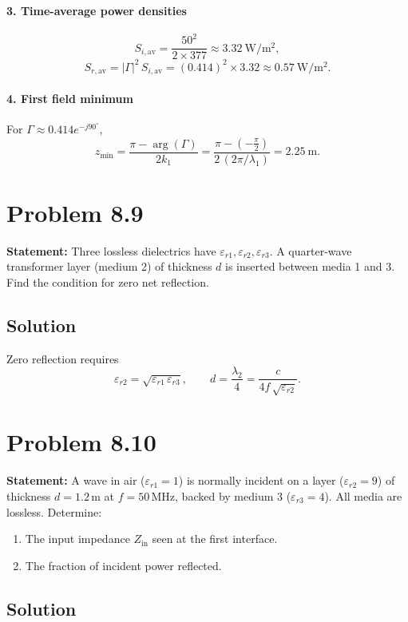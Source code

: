 \paragraph{3. Time-average power densities}
\[
S_{i,\mathrm{av}} = \frac{50^2}{2 \times 377} \approx 3.32\ \mathrm{W/m^2},
\]
\[
S_{r,\mathrm{av}}
= |\Gamma|^2\,S_{i,\mathrm{av}}
= (0.414)^2 \times 3.32
\approx 0.57\ \mathrm{W/m^2}.
\]

\paragraph{4. First field minimum}
For $\Gamma\approx0.414e^{-j90^\circ}$,
\[
z_{\min}
= \frac{\pi - \arg(\Gamma)}{2k_1}
= \frac{\pi - (-\frac{\pi}{2})}{2\,(2\pi/\lambda_1)}
= 2.25\ \mathrm{m}.
\]

\section*{Problem 8.9}
\textbf{Statement:} Three lossless dielectrics have $\varepsilon_{r1}, \varepsilon_{r2}, \varepsilon_{r3}$. A quarter-wave transformer layer (medium 2) of thickness $d$ is inserted between media 1 and 3. Find the condition for zero net reflection.

\subsection*{Solution}
Zero reflection requires
\[
\varepsilon_{r2} = \sqrt{\varepsilon_{r1}\,\varepsilon_{r3}},
\qquad
d = \frac{\lambda_2}{4}
      = \frac{c}{4f\,\sqrt{\varepsilon_{r2}}}.
\]

\section*{Problem 8.10}
\textbf{Statement:} A wave in air ($\varepsilon_{r1}=1$) is normally incident on a layer ($\varepsilon_{r2}=9$) of thickness $d=1.2\,$m at $f=50\,$MHz, backed by medium 3 ($\varepsilon_{r3}=4$). All media are lossless. Determine:
\begin{enumerate}
  \item The input impedance $Z_{\mathrm{in}}$ seen at the first interface.
  \item The fraction of incident power reflected.
\end{enumerate}

\subsection*{Solution}
